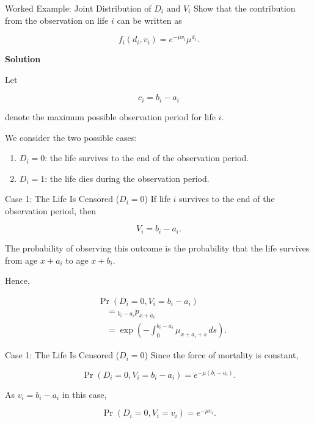 \documentclass[
  ignorenonframetext,
  aspectratio=169,
]{beamer}
\providecommand{\tightlist}{%
  \setlength{\itemsep}{0pt}\setlength{\parskip}{0pt}}
\begin{document}
\begin{frame}{Worked Example: Joint Distribution of \(D_i\) and \(V_i\)}
\protect{}\label{worked-example-joint-distribution-of-d_i-and-v_i}
Show that the contribution from the observation on life \(i\) can be
written as

\[
f_i(d_i,v_i)=e^{-\mu v_i}\mu^{d_i}.
\]

\textbf{Solution}

Let

\[
c_i=b_i-a_i
\]

denote the maximum possible observation period for life \(i\).

We consider the two possible cases:

\begin{enumerate}
\tightlist
\item
  \(D_i=0\): the life survives to the end of the observation period.
\item
  \(D_i=1\): the life dies during the observation period.
\end{enumerate}
\end{frame}

\begin{frame}{Case 1: The Life Is Censored (\(D_i=0\))}
\protect{}\label{case-1-the-life-is-censored-d_i0}
If life \(i\) survives to the end of the observation period, then

\[
V_i=b_i-a_i.
\]

The probability of observing this outcome is the probability that the
life survives from age \(x+a_i\) to age \(x+b_i\).

Hence,

\[
\begin{aligned}
&\Pr(D_i=0,V_i=b_i-a_i)\\
&\quad={}_{b_i-a_i}p_{x+a_i}\\
&\quad=\exp\left(
-\int_0^{b_i-a_i}\mu_{x+a_i+s}\,ds
\right).
\end{aligned}
\]
\end{frame}

\begin{frame}{Case 1: The Life Is Censored (\(D_i=0\))}
\protect{}\label{case-1-the-life-is-censored-d_i0-1}
Since the force of mortality is constant,

\[
\Pr(D_i=0,V_i=b_i-a_i)
=
e^{-\mu(b_i-a_i)}.
\]

As \(v_i=b_i-a_i\) in this case,

\[
\Pr(D_i=0,V_i=v_i)=e^{-\mu v_i}.
\]
\end{frame}
\end{document}
